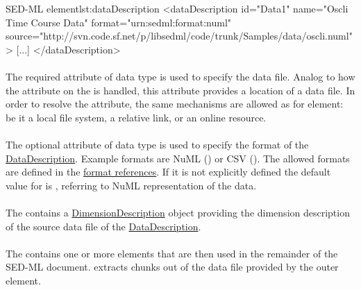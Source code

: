 \begin{myXmlLst}{SED-ML  element}{lst:dataDescription}
<dataDescription id="Data1" name="Oscli Time Course Data" format="urn:sedml:format:numl"
	source="http://svn.code.sf.net/p/libsedml/code/trunk/Samples/data/oscli.numl" >
    [...]
</dataDescription>
\end{myXmlLst} 

\paragraph*{}
\label{sec:data_source}
The required  attribute of data type \hyperref[type:anyURI]{} is used to specify the data file. Analog to how the \hyperref[sec:model_source]{} attribute on the \SedModel is handled, this attribute provides a location of a data file. In order to resolve the  attribute, the same mechanisms are allowed as for \SedModel element: be it a local file system, a relative link, or an online resource.

\paragraph*{}
\label{sec:format}
The optional  attribute of data type \hyperref[type:anyURI]{} is used to specify the format of the \hyperref[class:dataDescription]{DataDescription}. Example formats are NuML () or CSV (). The allowed formats are defined in the \hyperref[sec:dataFormatURI]{format references}. If it is not explicitly defined the default value for  is , referring to NuML representation of the data.

\paragraph*{}
\label{sec:dimensionDescription}
The  contains a \hyperref[class:dimensionDescription]{DimensionDescription} object providing the dimension description of the source data file of the \hyperref[class:dataDescription]{DataDescription}.

\paragraph*{}
\label{sec:listOfDataSources}
The  contains one or more \SedDataSource elements that are then used in the remainder of the SED-ML document. \SedDataSource extracts chunks out of the data file provided by the outer \SedDataDescription element. 

